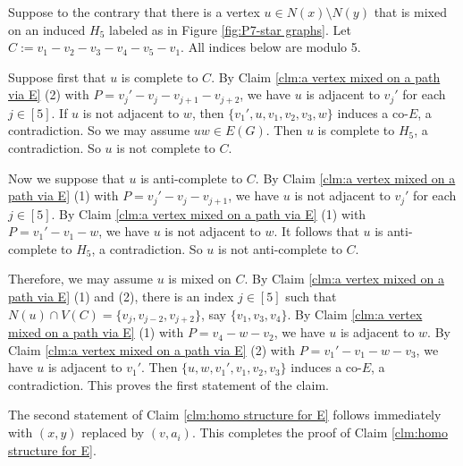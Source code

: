 \documentclass[a4paper,11pt]{article}
\let\oldendproof\endproof
\renewenvironment{proof}[1][\proofname]{%
	\oldproof[\normalfont\bfseries #1]%
}{\oldendproof}
\renewcommand{\qedsymbol}{$\square$}%
\newenvironment{subproof}[1][\normalfont\it Subproof]{%
	\renewcommand{\qedsymbol}{{\tiny{$\blacksquare$}}}%
	\begin{proof}[#1]%
	}{%
	\end{proof}%
}
\begin{document}
\begin{proof}
        \begin{subproof}[Proof of Claim \ref{clm:homo structure for E}]
            Suppose to the contrary that there is a vertex $u\in N(x)\setminus N(y)$ that is mixed on an induced $H_5$ labeled as in Figure \ref{fig:P7-star graphs}. 
            Let $C:=v_1-v_2-v_3-v_4-v_5-v_1$.  
            All indices below are modulo 5.
            
            Suppose first that $u$ is complete to $C$. 
            By Claim \ref{clm:a vertex mixed on a path via E} (2) with $P=v_j'-v_j-v_{j+1}-v_{j+2}$, we have $u$ is adjacent to $v_j'$ for each $j\in [5]$. 
            If $u$ is not adjacent to $w$, then $\{v_1',u,v_1,v_2,v_3,w\}$ induces a co-$E$, a contradiction. 
            So we may assume $uw\in E(G)$. 
            Then $u$ is complete to $H_5$, a contradiction. 
            So $u$ is not complete to $C$. 

            Now we suppose that $u$ is anti-complete to $C$. 
            By Claim \ref{clm:a vertex mixed on a path via E} (1) with $P=v_j'-v_j-v_{j+1}$, we have $u$ is not adjacent to $v_j'$ for each $j\in [5]$. 
            By Claim \ref{clm:a vertex mixed on a path via E} (1) with $P=v_1'-v_1-w$, we have $u$ is not adjacent to $w$. 
            It follows that $u$ is anti-complete to $H_5$, a contradiction. 
            So $u$ is not anti-complete to $C$. 

            Therefore, we may assume $u$ is mixed on $C$. 
            By Claim \ref{clm:a vertex mixed on a path via E} (1) and (2), there is an index $j\in [5]$ such that $N(u)\cap V(C)=\{v_j,v_{j-2},v_{j+2}\}$, say $\{v_1,v_{3},v_{4}\}$. 
            By Claim \ref{clm:a vertex mixed on a path via E} (1) with $P=v_4-w-v_2$, we have $u$ is adjacent to $w$. 
            By Claim \ref{clm:a vertex mixed on a path via E} (2) with $P=v_1'-v_1-w-v_3$, we have $u$ is adjacent to $v_1'$. 
            Then $\{u,w,v_1',v_1,v_2,v_3\}$ induces a co-$E$, a contradiction. This proves the first statement of the claim.
            
            The second statement of Claim \ref{clm:homo structure for E} follows immediately with $(x,y)$ replaced by $(v,a_i)$. 
            This completes the proof of Claim \ref{clm:homo structure for E}. 
        \end{subproof}
       

\end{proof}
\end{document}
